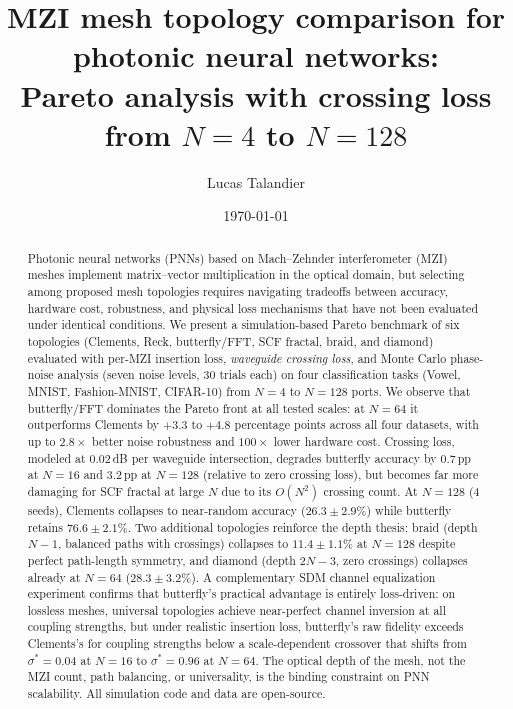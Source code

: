 \documentclass[11pt,a4paper]{article}
\title{MZI mesh topology comparison for photonic neural networks:\\
Pareto analysis with crossing loss from $N{=}4$ to $N{=}128$}
\author{Lucas Talandier}
\affil{Independent researcher, Paris, France}
\date{\today}
\begin{document}
\maketitle

\begin{abstract}
Photonic neural networks (PNNs) based on Mach--Zehnder interferometer (MZI) meshes
implement matrix--vector multiplication in the optical domain, but selecting among
proposed mesh topologies requires navigating tradeoffs between accuracy, hardware cost,
robustness, and physical loss mechanisms that have not been evaluated under identical
conditions.  We present a simulation-based Pareto benchmark of six topologies (Clements,
Reck, butterfly/FFT, SCF fractal, braid, and diamond) evaluated with per-MZI insertion loss,
\emph{waveguide crossing loss}, and Monte Carlo phase-noise analysis (seven noise levels,
30 trials each) on four classification tasks (Vowel, MNIST, Fashion-MNIST, CIFAR-10)
from $N{=}4$ to $N{=}128$ ports.  We observe that butterfly/FFT dominates the Pareto
front at all tested scales: at $N{=}64$ it outperforms Clements by $+3.3$ to $+4.8$
percentage points across all four datasets, with up to $2.8\times$ better noise robustness
and $100\times$ lower hardware cost.  Crossing loss, modeled at 0.02\,dB per waveguide
intersection, degrades butterfly accuracy by 0.7\,pp at $N{=}16$ and 3.2\,pp at $N{=}128$
(relative to zero crossing loss), but becomes far more damaging for SCF fractal at
large $N$ due to its $O(N^2)$ crossing count.  At $N{=}128$ (4 seeds), Clements collapses
to near-random accuracy ($26.3 \pm 2.9$\%) while butterfly retains $76.6 \pm 2.1$\%.
Two additional topologies reinforce the depth thesis: braid (depth $N{-}1$,
balanced paths with crossings) collapses to $11.4 \pm 1.1$\% at $N{=}128$
despite perfect path-length symmetry, and diamond (depth $2N{-}3$, zero
crossings) collapses already at $N{=}64$ ($28.3 \pm 3.2$\%).
A complementary SDM channel equalization experiment confirms that
butterfly's practical advantage is entirely loss-driven: on lossless
meshes, universal topologies achieve near-perfect channel inversion at
all coupling strengths, but under realistic insertion loss, butterfly's
raw fidelity exceeds Clements's for coupling strengths below a
scale-dependent crossover that shifts from $\sigma^* = 0.04$
at $N{=}16$ to $\sigma^* = 0.96$ at $N{=}64$.
The optical depth of the mesh, not the MZI count, path balancing, or
universality, is the binding constraint on PNN scalability.
All simulation code and data are open-source.
\end{abstract}
\end{document}
